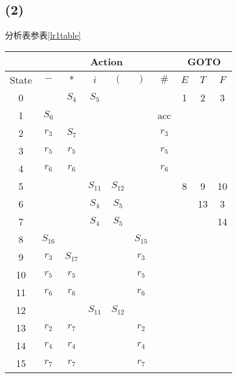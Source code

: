 \documentclass[UTF8]{ctexart}
\begin{document}
    \subsection*{(2)}
        分析表参表\ref{lr1table}
        \begin{table}[htbp!]
            \centering
            \begin{tabular}{|c|c|c|c|c|c|c|c|c|c|}
                \hline
                & \multicolumn{6}{|c|}{Action} & \multicolumn{3}{|c|}{GOTO} \\
                \hline
                State & $-$ & $*$ & $i$ & $($ & $)$ & $\#$ & $E$ & $T$ & $F$ \\
                \hline
                0 & & $S_4$ & $S_5$ & & & & 1 & 2 & 3 \\
                \hline
                1 & $S_6$ & & & & & acc & & & \\
                \hline
                2 & $r_3$ & $S_7$ & & & & $r_3$ & & & \\
                \hline
                3 & $r_5$ & $r_5$ & & & & $r_5$ & & & \\
                \hline
                4 & $r_6$ & $r_6$ & & & & $r_6$ & & & \\
                \hline
                5 & & & $S_{11}$ & $S_{12}$ & & & 8 & 9 & 10 \\
                \hline
                6 & & & $S_4$ & $S_5$ & & & & 13 & 3 \\
                \hline
                7 & & & $S_4$ & $S_5$ & & & & & 14 \\
                \hline
                8 & $S_{16}$ & & & & $S_{15}$ & & & & \\
                \hline
                9 & $r_3$ & $S_{17}$ & & & $r_3$ & & & & \\
                \hline
                10 & $r_5$ & $r_5$ & & & $r_5$ & & & & \\
                \hline
                11 & $r_6$ & $r_6$ & & & $r_6$ & & & & \\
                \hline
                12 & & & $S_{11}$ & $S_{12}$ & & & & & \\
                \hline
                13 & $r_2$ & $r_7$ & & & $r_2$ & & & & \\
                \hline
                14 & $r_4$ & $r_4$ & & & $r_4$ & & & & \\
                \hline
                15 & $r_7$ & $r_7$ & & & $r_7$ & & & & \\

\end{tabular}
\end{table}
\end{document}
